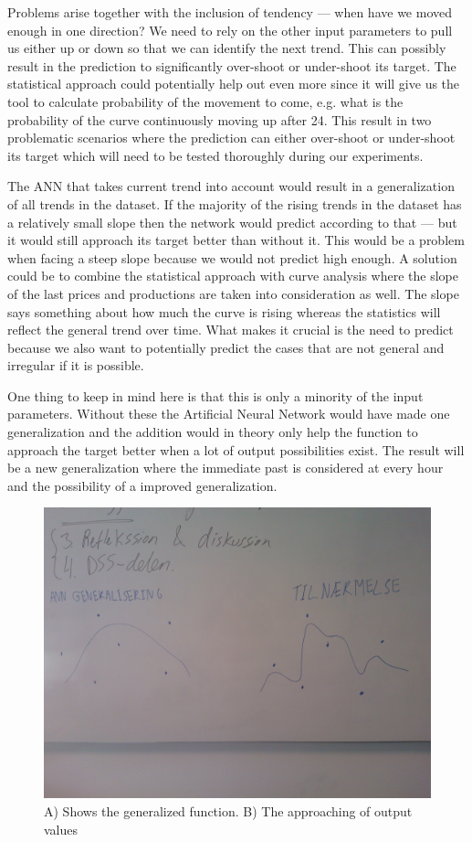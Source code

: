 Problems arise together with the inclusion of tendency --- when have we moved enough in one direction? We need to rely on the other input parameters to pull us either up or down so that we can identify the next trend. This can possibly result in the prediction to significantly over-shoot or under-shoot its target. The statistical approach could potentially help out even more since it will give us the tool to calculate probability of the movement to come, e.g. what is the probability of the curve continuously moving up after 24. This result in two problematic scenarios where the prediction can either over-shoot or under-shoot its target which will need to be tested thoroughly during our experiments. 

The ANN that takes current trend into account would result in a generalization of all trends in the dataset. If the majority of the rising trends in the dataset has a relatively small slope then the network would predict according to that --- but it would still approach its target better than without it. This would be a problem when facing a steep slope because we would not predict high enough. A solution could be to combine the statistical approach with curve analysis where the slope of the last prices and productions are taken into consideration as well. The slope says something about how much the curve is rising whereas the statistics will reflect the general trend over time. What makes it crucial is the need to predict because we also want to potentially predict the cases that are not general and irregular if it is possible.

One thing to keep in mind here is that this is only a minority of the input parameters. Without these the Artificial Neural Network would have made one generalization and the addition would in theory only help the function to approach the target better when a lot of output possibilities exist. The result will be a new generalization where the immediate past is considered at every hour and the possibility of a improved generalization.

\begin{figure}[H]
\centering
\includegraphics[width=0.99\linewidth,natwidth=898,natheight=587]{billeder/WP_000057.jpg}
\caption{A) Shows the generalized function. B) The approaching of output values}
\label{fig:WP}
\end{figure}

